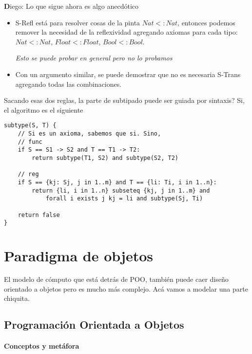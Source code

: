 \documentclass{report}
\theoremstyle{definition} %
\newenvironment{nota}[1]
    {\begin{leftbar}\textbf{#1}}
    {\end{leftbar}}
\newcommand{\subt}[2]{#1 <: #2}
\begin{document}
\begin{nota}
    Diego: Lo que sigue ahora es algo anecdótico
\end{nota}

\begin{itemize}
    \item S-Refl está para resolver cosas de la pinta $\subt{Nat}{Nat}$,
    entonces podemos remover la necesidad de la reflexividad agregando axiomas
    para cada tipo: $\subt{Nat}{Nat}$, $\subt{Float}{Float}$,
    $\subt{Bool}{Bool}$.

    \textit{Esto se puede probar en general pero no lo probamos}

    \item Con un argumento similar, se puede demostrar que no es necesaria
    S-Trans agregando todas las combinaciones.
\end{itemize}

Sacando esas dos reglas, la parte de subtipado puede ser guiada por sintaxis?
Si, el algoritmo es el siguiente

\begin{verbatim}
subtype(S, T) {
    // Si es un axioma, sabemos que si. Sino,
    // func
    if S == S1 -> S2 and T == T1 -> T2:
        return subtype(T1, S2) and subtype(S2, T2)
    
    // reg
    if S == {kj: Sj, j in 1..m} and T == {li: Ti, i in 1..n}:
        return {li, i in 1..n} subseteq {kj, j in 1..m} and
            forall i exists j kj = li and subtype(Sj, Ti)

    return false
}
\end{verbatim}

\chapter{Paradigma de objetos}

El modelo de cómputo que está detrás de POO, también puede caer diseño orientado
a objetos pero es mucho más complejo. Acá vamos a modelar una parte chiquita.

\section{Programación Orientada a Objetos}

\subsubsection{Conceptos y metáfora}
\end{document}
